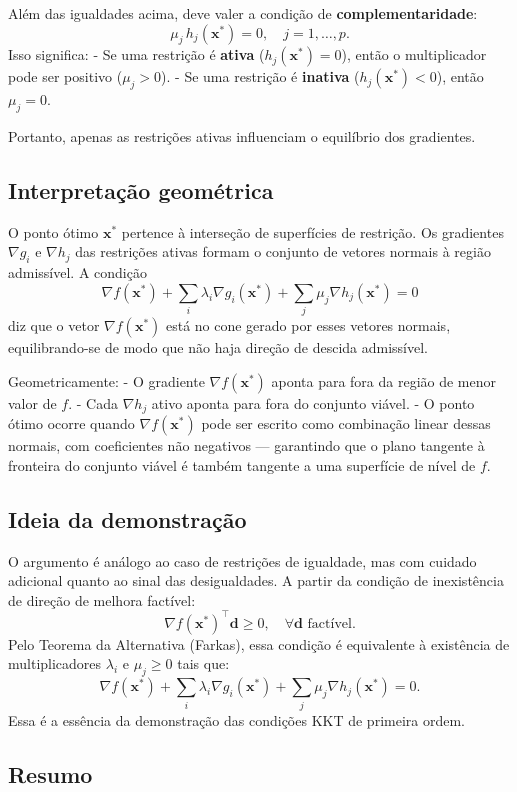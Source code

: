 \documentclass[9pt,a4paper]{extarticle}
\begin{document}
Além das igualdades acima, deve valer a condição de \textbf{complementaridade}:
\[
\mu_j \, h_j(\bm{x}^*) = 0, \quad j = 1, \dots, p.
\]
Isso significa:
- Se uma restrição é \textbf{ativa} ($h_j(\bm{x}^*)=0$), então o multiplicador pode ser positivo ($\mu_j>0$).
- Se uma restrição é \textbf{inativa} ($h_j(\bm{x}^*)<0$), então $\mu_j=0$.

Portanto, apenas as restrições ativas influenciam o equilíbrio dos gradientes.

\subsection*{Interpretação geométrica}

O ponto ótimo $\bm{x}^*$ pertence à interseção de superfícies de restrição.  
Os gradientes $\nabla g_i$ e $\nabla h_j$ das restrições ativas formam o conjunto de vetores normais à região admissível.  
A condição
\[
\nabla f(\bm{x}^*) + \sum_i \lambda_i \nabla g_i(\bm{x}^*) + \sum_j \mu_j \nabla h_j(\bm{x}^*) = 0
\]
diz que o vetor $\nabla f(\bm{x}^*)$ está no cone gerado por esses vetores normais, equilibrando-se de modo que não haja direção de descida admissível.  

Geometricamente:
- O gradiente $\nabla f(\bm{x}^*)$ aponta para fora da região de menor valor de $f$.  
- Cada $\nabla h_j$ ativo aponta para fora do conjunto viável.  
- O ponto ótimo ocorre quando $\nabla f(\bm{x}^*)$ pode ser escrito como combinação linear dessas normais, com coeficientes não negativos — garantindo que o plano tangente à fronteira do conjunto viável é também tangente a uma superfície de nível de $f$.

\subsection*{Ideia da demonstração}

O argumento é análogo ao caso de restrições de igualdade, mas com cuidado adicional quanto ao sinal das desigualdades.  
A partir da condição de inexistência de direção de melhora factível:
\[
\nabla f(\bm{x}^*)^\top \bm{d} \ge 0, \quad \forall \bm{d} \text{ factível.}
\]
Pelo Teorema da Alternativa (Farkas), essa condição é equivalente à existência de multiplicadores $\lambda_i$ e $\mu_j \ge 0$ tais que:
\[
\nabla f(\bm{x}^*) + \sum_i \lambda_i \nabla g_i(\bm{x}^*) + \sum_j \mu_j \nabla h_j(\bm{x}^*) = 0.
\]
Essa é a essência da demonstração das condições KKT de primeira ordem.

\subsection*{Resumo}
\end{document}
